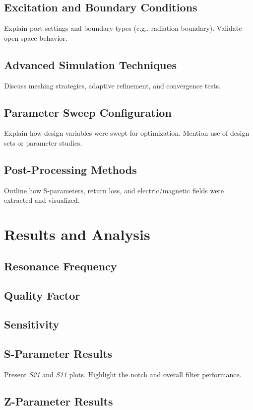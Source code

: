 \documentclass[conference]{IEEEtran}
\begin{document}
\subsection{Excitation and Boundary Conditions}
Explain port settings and boundary types (e.g., radiation boundary). Validate open-space behavior.

\subsection{Advanced Simulation Techniques}
Discuss meshing strategies, adaptive refinement, and convergence tests.

\subsection{Parameter Sweep Configuration}
Explain how design variables were swept for optimization. Mention use of design sets or parameter studies.

\subsection{Post-Processing Methods}
Outline how S-parameters, return loss, and electric/magnetic fields were extracted and visualized.

\section{Results and Analysis}
\subsection{Resonance Frequency}

\subsection{Quality Factor}

\subsection{Sensitivity}

\subsection{S-Parameter Results}
Present \textit{S21} and \textit{S11} plots. Highlight the notch and overall filter performance.

\subsection{Z-Parameter Results}
\end{document}
